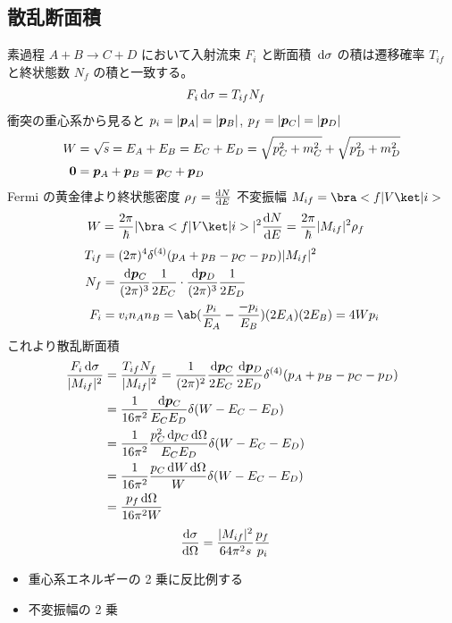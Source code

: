 \documentclass[a4paper,11pt]{jlreq}
\begin{document}
\subsection{散乱断面積}
素過程 $A + B \to C + D$ において入射流束 $F_i$ と断面積 $\dl{\sigma}$ の積は遷移確率 $T_{if}$ と終状態数 $N_f$ の積と一致する。
\begin{align}
  F_i\dl{\sigma} & = T_{if}N_f
\end{align}
衝突の重心系から見ると $p_i = |\bm{p}_A| = |\bm{p}_B|$, $p_f = |\bm{p}_C| = |\bm{p}_D|$
\begin{align}
  W      & = \sqrt{s} = E_A + E_B = E_C + E_D = \sqrt{p_C^2 + m_C^2} + \sqrt{p_D^2 + m_D^2} \\
  \bm{0} & = \bm{p}_A + \bm{p}_B = \bm{p}_C + \bm{p}_D
\end{align}
Fermi の黄金律より終状態密度 $\rho_f = \diff{N}{E}$ 不変振幅 $M_{if} = \bra<f|V\ket|i>$
\begin{align}
  W & = \frac{2\pi}{\hbar}|\bra<f|V\ket|i>|^2\diff{N}{E} = \frac{2\pi}{\hbar}|M_{if}|^2\rho_f
\end{align}
\begin{align}
  T_{if} & = (2\pi)^4\delta^{(4)}(p_A + p_B - p_C - p_D)|M_{if}|^2                                     \\
  N_f    & = \frac{\dl{\pp_C}}{(2\pi)^3}\frac{1}{2E_C} \cdot \frac{\dl{\pp_D}}{(2\pi)^3}\frac{1}{2E_D} \\
  F_i    & = v_in_An_B = \ab(\frac{p_i}{E_A} - \frac{-p_i}{E_B})(2E_A)(2E_B) = 4Wp_i
\end{align}
これより散乱断面積
\begin{align}
  \frac{F_i\dl{\sigma}}{|M_{if}|^2} & = \frac{T_{if}N_f}{|M_{if}|^2} = \frac{1}{(2\pi)^2}\frac{\dl{\pp_C}}{2E_C}\frac{\dl{\pp_D}}{2E_D}\delta^{(4)}(p_A + p_B - p_C - p_D) \\
                                    & = \frac{1}{16\pi^2}\frac{\dl{\pp_C}}{E_CE_D}\delta(W - E_C - E_D)                                                                    \\
                                    & = \frac{1}{16\pi^2}\frac{p_C^2\dl{p_C}\dl{\Omega}}{E_CE_D}\delta(W - E_C - E_D)                                                      \\
                                    & = \frac{1}{16\pi^2}\frac{p_C\dl{W}\dl{\Omega}}{W}\delta(W - E_C - E_D)                                                               \\
                                    & = \frac{p_f\dl{\Omega}}{16\pi^2W}
\end{align}
\begin{align}
  \diff{\sigma}{\Omega} & = \frac{|M_{if}|^2}{64\pi^2s}\frac{p_f}{p_i}
\end{align}
\begin{itemize}
  \item 重心系エネルギーの 2 乗に反比例する
  \item 不変振幅の 2 乗
\end{itemize}
\end{document}

